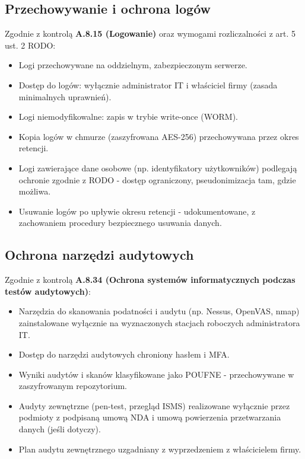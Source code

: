 \documentclass[12pt,a4paper]{article}
\providecommand{\tightlist}{\setlength{\itemsep}{0pt}\setlength{\parskip}{0pt}}
\begin{document}
\newpage
\subsection{Przechowywanie i ochrona logów}\label{przechowywanie-i-ochrona-logow}

Zgodnie z kontrolą \textbf{A.8.15 (Logowanie)} oraz wymogami rozliczalności z art. 5 ust. 2 RODO:
\begin{itemize}
\tightlist
\item
  Logi przechowywane na oddzielnym, zabezpieczonym serwerze.
\item
  Dostęp do logów: wyłącznie administrator IT i właściciel firmy (zasada minimalnych uprawnień).
\item
  Logi niemodyfikowalne: zapis w trybie write-once (WORM).
\item
  Kopia logów w chmurze (zaszyfrowana AES-256) przechowywana przez okres retencji.
\item
  Logi zawierające dane osobowe (np. identyfikatory użytkowników) podlegają ochronie zgodnie z RODO - dostęp ograniczony, pseudonimizacja tam, gdzie możliwa.
\item
  Usuwanie logów po upływie okresu retencji - udokumentowane, z zachowaniem procedury bezpiecznego usuwania danych.
\end{itemize}

\subsection{Ochrona narzędzi audytowych}\label{ochrona-narzedzi-audytowych}

Zgodnie z kontrolą \textbf{A.8.34 (Ochrona systemów informatycznych podczas testów audytowych)}:
\begin{itemize}
\tightlist
\item
  Narzędzia do skanowania podatności i audytu (np. Nessus, OpenVAS, nmap) zainstalowane wyłącznie na wyznaczonych stacjach roboczych administratora IT.
\item
  Dostęp do narzędzi audytowych chroniony hasłem i MFA.
\item
  Wyniki audytów i skanów klasyfikowane jako POUFNE - przechowywane w zaszyfrowanym repozytorium.
\item
  Audyty zewnętrzne (pen-test, przegląd ISMS) realizowane wyłącznie przez podmioty z podpisaną umową NDA i umową powierzenia przetwarzania danych (jeśli dotyczy).
\item
  Plan audytu zewnętrznego uzgadniany z wyprzedzeniem z właścicielem firmy.
\end{itemize}
\end{document}

